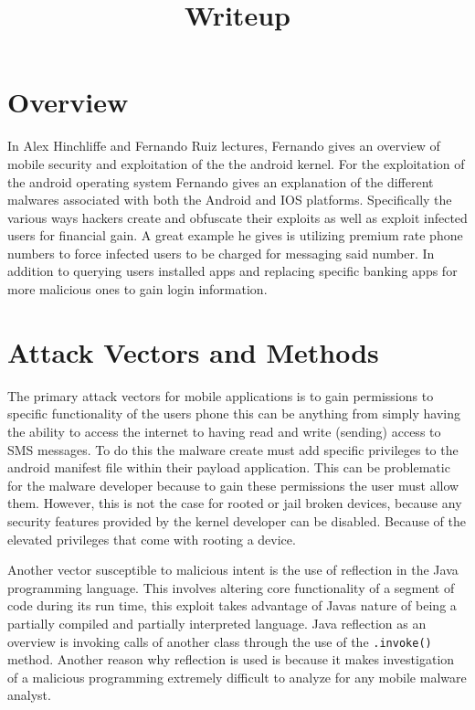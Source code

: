 \documentclass[letterpaper,12pt,titlepage,onecolumn]{IEEEtran}
\author{\name}
\title{Writeup}
\begin{document}
\maketitle
\hrulefill


\section{Overview}
In Alex Hinchliffe and Fernando Ruiz lectures, Fernando gives an overview of mobile security and exploitation of the the android kernel. For the exploitation of the android operating system Fernando gives an explanation of the different malwares associated with both the Android and IOS platforms. Specifically the various ways hackers create and obfuscate their exploits as well as exploit infected users for financial gain. A great example he gives is utilizing premium rate phone numbers to force infected users to be charged for messaging said number. In addition to querying users installed apps and replacing specific banking apps for more malicious ones to gain login information.\par

\section{Attack Vectors and Methods}
The primary attack vectors for mobile applications is to gain permissions to specific functionality of the users phone this can be anything from simply having the ability to access the internet to having read and write (sending) access to SMS messages. To do this the malware create must add specific privileges to the android manifest file within their payload application. This can be problematic for the malware developer because to gain these permissions the user must allow them. However, this is not the case for rooted or jail broken devices, because any security features provided by the kernel developer can be disabled. Because of the elevated privileges that come with rooting a device.\par
Another vector susceptible to malicious intent is the use of reflection in the Java programming language. This involves altering core functionality of a segment of code during its run time, this exploit takes advantage of Javas nature of being a partially compiled and partially interpreted language. Java reflection as an overview is invoking calls of another class through the use of the \texttt{.invoke()} method. Another reason why reflection is used is because it makes investigation of a malicious programming extremely difficult to analyze for any mobile malware analyst.\par
\end{document}

